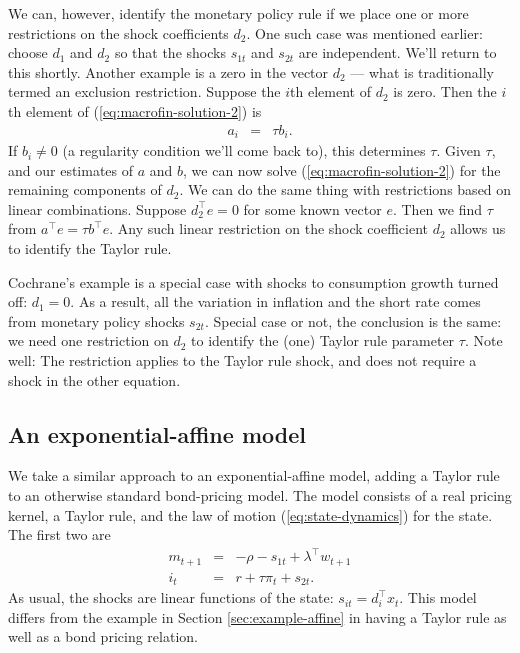 \documentclass[11pt]{article}
\begin{document}
{We can, however, identify the monetary policy rule
if we place one or more restrictions on the shock coefficients $d_2$.
One such case was mentioned earlier:
choose $d_1$ and $d_2$ so that the shocks $s_{1t}$ and $s_{2t}$ are independent.
We'll return to this shortly.
Another example is a zero in the vector $d_2$ ---
what is traditionally termed an exclusion restriction.
Suppose the $i$th element of $d_2$ is zero.
Then the $i$th element of (\ref{eq:macrofin-solution-2}) is
\begin{eqnarray*}
    a_i &=& \tau b_i .
\end{eqnarray*}
If $b_i \neq 0$ (a regularity condition we'll come back to),
this determines $\tau$.
Given $\tau$, and our estimates of $a$ and $b$,
we can now solve (\ref{eq:macrofin-solution-2}) for
the remaining components of $d_2$.
We can do the same thing with restrictions based on linear combinations.
Suppose $d_2^\top e = 0$ for some known vector $e$.
Then we find $\tau$ from $a^\top e = \tau b^\top e$.
Any such linear restriction on the shock coefficient $d_2$ allows
us to identify the Taylor rule.

Cochrane's example is a special case with shocks to
consumption growth turned off:  $d_1 = 0$.
As a result, all the variation in inflation and the short rate
comes from monetary policy shocks $s_{2t}$.
Special case or not, the conclusion is the same:
we need one restriction on $d_2$ to identify the (one) Taylor rule parameter $\tau$.
Note well:  The restriction applies to the Taylor rule shock,
and does not require a shock in the other equation.


\subsection{An exponential-affine model}

We take a similar approach to an exponential-affine model,
adding a Taylor rule to an otherwise standard bond-pricing model.
The model consists of a real pricing kernel,
a Taylor rule, and the law of motion (\ref{eq:state-dynamics}) for the state.
The first two are
\begin{eqnarray*}
    m_{t+1} &=& -\rho - s_{1t} + \lambda^\top w_{t+1} \\
    i_t &=& r + \tau \pi_t + s_{2t} .
\end{eqnarray*}
As usual, the shocks are linear functions of the state:  $s_{it} = d_i^\top x_t$.
This model differs from the example in Section \ref{sec:example-affine}
in having a Taylor rule as well as a bond pricing relation.

}
\end{document}
